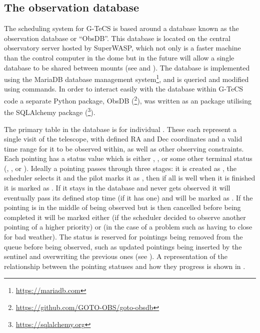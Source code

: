 \subsection{The observation database}
\label{sec:obsdb}
\begin{colsection}

The scheduling system for G-TeCS is based around a database known as the observation database or ``ObsDB''. This database is located on the central observatory server hosted by SuperWASP, which not only is a faster machine than the control computer in the dome but in the future will allow a single database to be shared between mounts (see  and ). The database is implemented using the MariaDB database management system\footnote{\url{https://mariadb.com}}, and is queried and modified using  commands. In order to interact easily with the database within G-TeCS code a separate Python package, ObsDB (\footnote{\url{https://github.com/GOTO-OBS/goto-obsdb}}), was written as an  package utilising the SQLAlchemy package (\footnote{\url{https://sqlalchemy.org}}).

The primary table in the database is for individual . These each represent a single visit of the telescope, with defined RA and Dec coordinates and a valid time range for it to be observed within, as well as other observing constraints. Each pointing has a status value which is either , ,  or some other terminal status (, ,  or ). Ideally a pointing passes through three stages: it is created as , the scheduler selects it and the pilot marks it as , then if all is well when it is finished it is marked as . If it stays in the database and never gets observed it will eventually pass its defined stop time (if it has one) and will be marked as . If the pointing is in the middle of being observed but is then cancelled before being completed it will be marked either  (if the scheduler decided to observe another pointing of a higher priority) or  (in the case of a problem such as having to close for bad weather). The  status is reserved for pointings being removed from the queue before being observed, such as updated pointings being inserted by the sentinel and overwriting the previous ones (see ). A representation of the relationship between the pointing statuses and how they progress is shown in .


\end{colsection}
